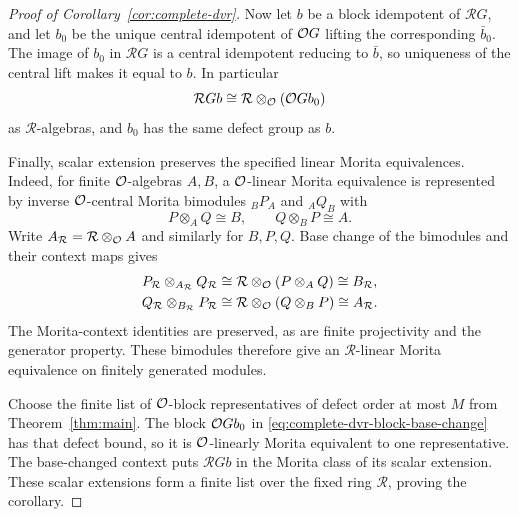 \begin{proof}[Proof of Corollary~\ref{cor:complete-dvr}]
Now let $b$ be a block idempotent of $\mathcal R G$, and let $b_0$ be
the unique central idempotent of $\mathcal O G$ lifting the corresponding
$\bar b_0$.  The image of $b_0$ in $\mathcal R G$ is a central
idempotent reducing to $\bar b$, so uniqueness of the central lift
makes it equal to $b$.  In particular
\begin{equation}\label{eq:complete-dvr-block-base-change}
 \mathcal R G b\cong\mathcal R\otimes_{\mathcal O}(\mathcal O G b_0)
\end{equation}
as $\mathcal R$-algebras, and $b_0$ has the same defect group as $b$.

Finally, scalar extension preserves the specified linear Morita
equivalences.  Indeed, for finite $\mathcal O$-algebras $A,B$, a
$\mathcal O$-linear Morita equivalence is represented by inverse
$\mathcal O$-central Morita bimodules ${}_B P_A$ and ${}_A Q_B$ with
\[
 P\otimes_A Q\cong B,\qquad Q\otimes_B P\cong A.
\]
Write $A_{\mathcal R}=\mathcal R\otimes_{\mathcal O}A$ and similarly for
$B,P,Q$.  Base change of the bimodules and their context maps gives
\[
\begin{aligned}
 P_{\mathcal R}\otimes_{A_{\mathcal R}}Q_{\mathcal R}
   &\cong\mathcal R\otimes_{\mathcal O}(P\otimes_A Q)
    \cong B_{\mathcal R},\\
 Q_{\mathcal R}\otimes_{B_{\mathcal R}}P_{\mathcal R}
   &\cong\mathcal R\otimes_{\mathcal O}(Q\otimes_B P)
    \cong A_{\mathcal R}.
\end{aligned}
\]
The Morita-context identities are preserved, as are finite
projectivity and the generator property.  These bimodules therefore
give an $\mathcal R$-linear Morita equivalence on finitely generated
modules.

Choose the finite list of $\mathcal O$-block representatives of defect order
at most $M$ from Theorem~\ref{thm:main}.  The block $\mathcal O G b_0$ in
\eqref{eq:complete-dvr-block-base-change} has that defect bound, so it
is $\mathcal O$-linearly Morita equivalent to one representative.  The
base-changed context puts $\mathcal R G b$ in the Morita class of its
scalar extension.  These scalar extensions form a finite list over the
fixed ring $\mathcal R$, proving the corollary.
\end{proof}
